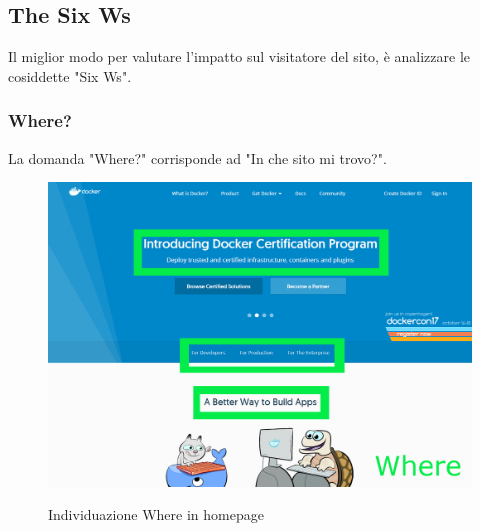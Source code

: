 \documentclass[a4paper]{article}
\begin{document}
\newpage
\subsection{The Six Ws}
Il miglior modo per valutare l'impatto sul visitatore del sito, è analizzare le cosiddette "Six Ws".

\subsubsection{Where?}
La domanda "Where?" corrisponde ad "In che sito mi trovo?".

\begin{figure}[H]
	\centering
	\includegraphics[width=\linewidth]{images/where.png}
    \label{fig:homepagewhere}
    \caption{Individuazione Where in homepage}
\end{figure}
\end{document}
